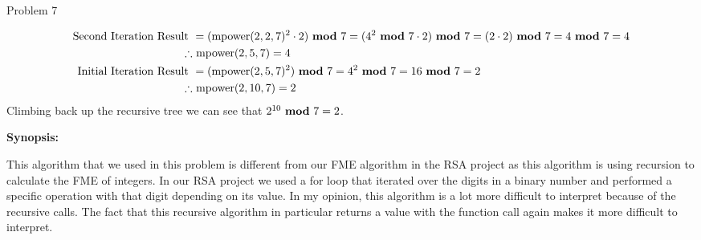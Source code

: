 \begin{problem}{Problem 7}
\begin{highlight}[Solution - \#6]
\begin{enumerate}[label = \arabic*., start = 6]
{\begin{align*}
                    \text{Second Iteration Result } & = (\text{mpower}(2,2,7)^{2} \cdot 2) \text{ \textbf{mod} } 7 = (4^{2} \text{ \textbf{mod} } 7 \cdot 2) \text{ \textbf{mod} } 7 = (2 \cdot 2) \text{ \textbf{mod} } 7 = 4 \text{ \textbf{mod} } 7 = 4 \\
                    \therefore & \text{ mpower}(2,5,7) = 4 \\
                    \text{Initial Iteration Result } & = (\text{mpower}(2,5,7)^{2}) \text{ \textbf{mod} } 7 = 4^{2} \text{ \textbf{mod} } 7 = 16 \text{ \textbf{mod} } 7 = 2 \\
                    \therefore & \text{ mpower}(2,10,7) = 2
                \end{align*}
            }
            \normalsize
            Climbing back up the recursive tree we can see that $2^{10} \text{ \textbf{mod} } 7 = 2$.            
        \end{enumerate}
        
        \textbf{Synopsis:} \vspace*{1em}

        This algorithm that we used in this problem is different from our FME algorithm in the RSA project as this algorithm is using recursion to calculate the FME of integers. In our RSA project
        we used a for loop that iterated over the digits in a binary number and performed a specific operation with that digit depending on its value. In my opinion, this algorithm is a lot more
        difficult to interpret because of the recursive calls. The fact that this recursive algorithm in particular returns a value with the function call again makes it more difficult to interpret.
    \end{highlight}
\end{problem}

